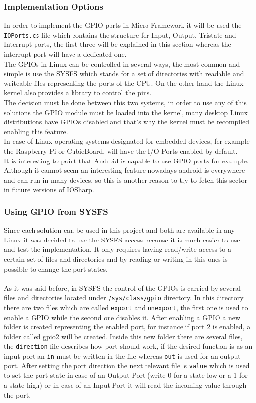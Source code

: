 \subsubsection{Implementation Options}\label{SSS:Implementation-Options}
In order to implement the GPIO ports in Micro Framework it will be used the \verb!IOPorts.cs! file which contains the structure for Input, Output, Tristate and Interrupt ports, the first three will be explained in this section whereas the interrupt port will have a dedicated one.
\\
The GPIOs in Linux can be controlled in several ways, the most common and simple is use the \gls{SYSFS} which stands for a set of directories with readable and writeable files representing the ports of the CPU. On the other hand the Linux kernel also provides a library to control the pins.
\\
The decision must be done between this two systems, in order to use any of this solutions the GPIO module must be loaded into the kernel, many desktop Linux distributions have GPIOs disabled and that's why the kernel must be recompiled enabling this feature.
\\
In case of Linux operating systems designated for embedded devices, for example the Raspberry Pi or CubieBoard, will have the I/O Ports enabled by default.
\\
It is interesting to point that Android is capable to use GPIO ports for example. Although it cannot seem an interesting feature nowadays android is everywhere and can run in many devices, so this is another reason to try to fetch this sector in future versions of IOSharp.

\subsubsection{Using GPIO from SYSFS}\label{SSS:IOSharp-GPIO-SYSFS}
Since each solution can be used in this project and both are available in any Linux it was decided to use the SYSFS access because it is much easier to use and test the implementation. It only requires having read/write access to a certain set of files and directories and by reading or writing in this ones is possible to change the port states.
\\
\\
As it was said before, in SYSFS the control of the GPIOs is carried by several files and directories located under \verb!/sys/class/gpio! directory. In this directory there are two files which are called \verb!export! and \verb!unexport!, the first one is used to enable a GPIO while the second one disables it. After enabling a GPIO a new folder is created representing the enabled port, for instance if port 2 is enabled, a folder called gpio2 will be created. Inside this new folder there are several files, the \verb!direction! file describes how port should work, if the desired function is as an input port an \verb!in! must be written in the file whereas \verb!out! is used for an output port. After setting the port direction the next relevant file is \verb!value! which is used to set the port state in case of an Output Port (write 0 for a state-low or a 1 for a state-high) or in case of an Input Port it will read the incoming value through the port.

